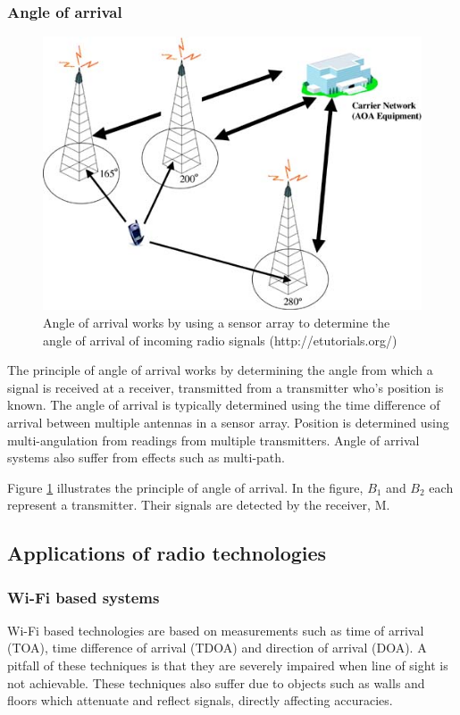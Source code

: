 \documentclass[11pt,a4paper]{report}
\begin{document}
		\subsubsection{Angle of arrival}
			\begin{figure}[H]
				\centering
				\includegraphics[width=1\textwidth]{angle_of_arrival}
				\caption[Angle of arrival]{Angle of arrival works by using a sensor array to determine the angle of arrival of incoming radio signals (http://etutorials.org/)}
				\label{fig:angle_of_arrival}
			\end{figure}
			The principle of angle of arrival works by determining the angle from which a signal is received at a receiver, transmitted from a transmitter who's position is known. The angle of arrival is typically determined using the time difference of arrival between multiple antennas in a sensor array. Position is determined using multi-angulation from readings from multiple transmitters.
			Angle of arrival systems also suffer from effects such as multi-path.
			
			Figure \ref{fig:angle_of_arrival} illustrates the principle of angle of arrival. In the figure, $B_1$ and $B_2$ each represent a transmitter. Their signals are detected by the receiver, M.
			
	\subsection{Applications of radio technologies}
		\subsubsection{Wi-Fi based systems}
			Wi-Fi based technologies are based on measurements such as time of arrival (TOA), time difference of arrival (TDOA) and direction of arrival (DOA). A pitfall of these techniques is that they are severely impaired when line of sight is not achievable. 
			These techniques also suffer due to objects such as walls and floors which attenuate and reflect signals, directly affecting accuracies.
		
\end{document}
